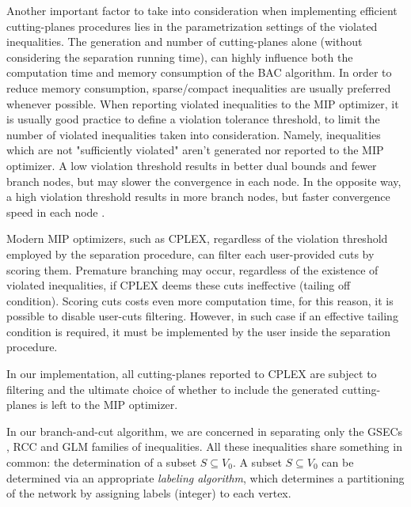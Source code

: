 Another important factor to take into consideration when implementing
efficient cutting-planes procedures lies in the parametrization settings
of the violated inequalities.
The generation and number of cutting-planes alone (without considering the separation running time),
can highly influence both the computation time and memory consumption of the BAC algorithm.
In order to reduce memory consumption, sparse/compact inequalities are usually preferred whenever possible.
When reporting violated inequalities to the MIP optimizer,
it is usually good practice to define a violation tolerance threshold,
to limit the number of violated inequalities taken into consideration.
Namely, inequalities which are not "sufficiently violated" aren't generated nor reported
to the MIP optimizer.
A low violation threshold results in better dual bounds and fewer branch nodes,
but may slower the convergence in each node.
In the opposite way, a high violation threshold results in more branch nodes,
but faster convergence speed in each node \parencite{jepsen2008branchandcut}.

Modern MIP optimizers, such as CPLEX, regardless of the violation threshold
employed by the separation procedure,
can filter each user-provided cuts by scoring them.
Premature branching may occur, regardless of the existence of violated inequalities,
if CPLEX deems these cuts ineffective (tailing off condition).
Scoring cuts costs even more computation time,
for this reason,
it is possible to disable user-cuts filtering.
However, in such case if an effective tailing condition is required,
it must be implemented by the user inside the separation procedure.

In our implementation, all cutting-planes reported to CPLEX are subject to filtering
and the ultimate choice of whether to include the generated cutting-planes is left to the MIP optimizer.

\medskip

In our branch-and-cut algorithm,
we are concerned in separating only the
GSECs ,
RCC 
and GLM 
families of inequalities.
All these inequalities share something in common:
the determination of a subset $S \subseteq V_0$.
A subset $S \subseteq V_0$ can be determined via an appropriate \textit{labeling algorithm},
which determines a partitioning of the network by assigning labels (integer) to each vertex.

